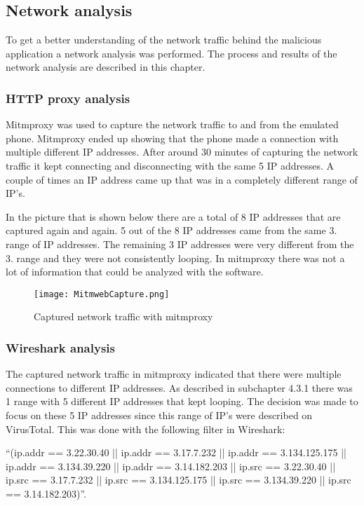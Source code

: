 \subsection{Network analysis}
To get a better understanding of the network traffic behind the malicious application a network analysis was performed.
The process and results of the network analysis are described in this chapter.

\subsubsection{HTTP proxy analysis}
Mitmproxy was used to capture the network traffic to and from the emulated phone.
Mitmproxy ended up showing that the phone made a connection with multiple different IP addresses.
After around 30 minutes of capturing the network traffic it kept connecting and disconnecting with the same 5 IP addresses.
A couple of times an IP address came up that was in a completely different range of IP’s.

In the picture that is shown below there are a total of 8 IP addresses that are captured again and again.
5 out of the 8 IP addresses came from the same 3. range of IP addresses.
The remaining 3 IP addresses were very different from the 3.  range and they were not consistently looping.
In mitmproxy there was not a lot of information that could be analyzed with the software.

\begin{figure}[H]
    \centering
    \texttt{[image: MitmwebCapture.png]}
    \caption{Captured network traffic with mitmproxy}
    \label{jordy-mitmweb}
\end{figure}

\newpage
\subsubsection{Wireshark analysis}
The captured network traffic in mitmproxy indicated that there were multiple connections to different IP addresses.
As described in subchapter 4.3.1 there was 1 range with 5 different IP addresses that kept looping.
The decision was made to focus on these 5 IP addresses since this range of IP’s were described on VirusTotal.
This was done with the following filter in Wireshark:

“(ip.addr == 3.22.30.40 || ip.addr == 3.17.7.232 || ip.addr == 3.134.125.175 || ip.addr == 3.134.39.220 || ip.addr == 3.14.182.203 || ip.src == 3.22.30.40 || ip.src == 3.17.7.232 || ip.src == 3.134.125.175 || ip.src == 3.134.39.220 || ip.src == 3.14.182.203)”.
 
